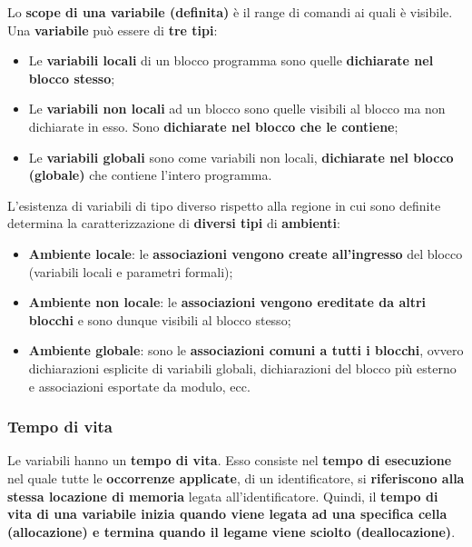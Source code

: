 \documentclass[a4paper]{article}
\begin{document}
 	Lo \textbf{scope di una variabile (definita)} è il range di comandi ai quali è visibile. Una \textbf{variabile} può essere di \textbf{tre tipi}:
 	\begin{itemize}
 		\item Le \textcolor{Red3}{\textbf{variabili locali}} di un blocco programma sono quelle \textbf{dichiarate nel blocco stesso};
 		
 		\item Le \textcolor{Red3}{\textbf{variabili non locali}} ad un blocco sono quelle visibili al blocco ma non dichiarate in esso. Sono \textbf{dichiarate nel blocco che le contiene};
 		
 		\item Le \textcolor{Red3}{\textbf{variabili globali}} sono come variabili non locali, \textbf{dichiarate nel blocco (globale)} che contiene l'intero programma.
 	\end{itemize}
 	L'esistenza di variabili di tipo diverso rispetto alla regione in cui sono definite determina la caratterizzazione di \textbf{diversi tipi} di \textbf{ambienti}:
 	\begin{itemize}
 		\item \textcolor{Red3}{\textbf{Ambiente locale}}: le \textbf{associazioni vengono create all'ingresso} del blocco (variabili locali e parametri formali);
 		
 		\item \textcolor{Red3}{\textbf{Ambiente non locale}}: le \textbf{associazioni vengono ereditate da altri blocchi} e sono dunque visibili al blocco stesso;
 		
 		\item \textcolor{Red3}{\textbf{Ambiente globale}}: sono le \textbf{associazioni comuni a tutti i blocchi}, ovvero dichiarazioni esplicite di variabili globali, dichiarazioni del blocco più esterno e associazioni esportate da modulo, ecc.
 	\end{itemize}\newpage
 	
 	\subsubsection{Tempo di vita}
 	
 	Le variabili hanno un \textcolor{Red3}{\textbf{tempo di vita}}. Esso consiste nel \textbf{tempo di esecuzione} nel quale tutte le \textbf{occorrenze applicate}, di un identificatore, si \textbf{riferiscono alla stessa locazione di memoria} legata all'identificatore. Quindi, il \textbf{tempo di vita di una variabile inizia quando viene legata ad una specifica cella (allocazione) e termina quando il legame viene sciolto (deallocazione)}.\newline
 	
\end{document}
